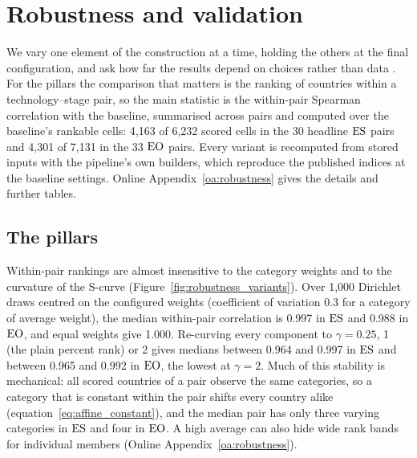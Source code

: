 \section{Robustness and validation}
\label{sec:robustness}

We vary one element of the construction at a time, holding the others at the final configuration,
and ask how far the results depend on choices rather than data
\citep{saisana2005uncertainty,oecd2008handbook,saltelli2008global}. For the pillars the comparison
that matters is the ranking of countries within a technology--stage pair, so the main statistic is
the within-pair Spearman correlation with the baseline, summarised across pairs and computed over
the baseline's rankable cells: 4{,}163 of 6{,}232 scored cells in the 30 headline $\mathrm{ES}$ pairs and
4{,}301 of 7{,}131 in the 33 $\mathrm{EO}$ pairs. Every variant is recomputed from stored inputs with the
pipeline's own builders, which reproduce the published indices at the baseline settings. Online
Appendix~\ref{oa:robustness} gives the details and further tables.

\subsection{The pillars}
\label{subsec:robust_pillars}

Within-pair rankings are almost insensitive to the category weights and to the curvature of the
S-curve (Figure~\ref{fig:robustness_variants}). Over 1{,}000 Dirichlet draws centred on the
configured weights (coefficient of variation 0.3 for a category of average weight), the median
within-pair correlation is 0.997 in $\mathrm{ES}$ and 0.988 in $\mathrm{EO}$, and equal weights give 1.000.
Re-curving every component to $\gamma=0.25$, 1 (the plain percent rank) or 2 gives medians between
0.964 and 0.997 in $\mathrm{ES}$ and between 0.965 and 0.992 in $\mathrm{EO}$, the lowest at $\gamma=2$. Much of
this stability is mechanical: all scored countries of a pair observe the same categories, so a
category that is constant within the pair shifts every country alike
(equation~\eqref{eq:affine_constant}), and the median pair has only three varying categories in
$\mathrm{ES}$ and four in $\mathrm{EO}$. A high average can also hide wide rank bands for individual members
(Online Appendix~\ref{oa:robustness}).

